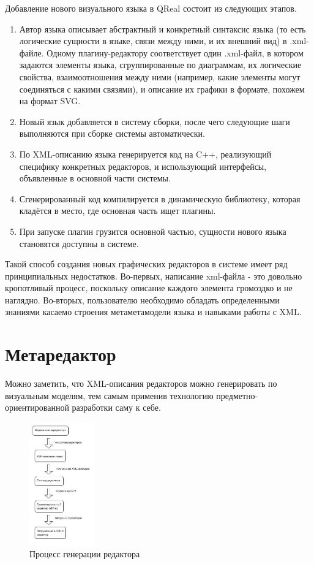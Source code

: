 \documentclass[a4paper]{article}
\begin{document}
Добавление нового визуального языка в QReal состоит из следующих этапов.
\begin{enumerate}
  \item Автор языка описывает абстрактный и конкретный синтаксис языка (то есть логические сущности в языке, связи между ними, и их внешний вид) в .xml-файле. Одному плагину-редактору соответствует один .xml-файл, в котором задаются элементы языка, сгруппированные по диаграммам, их логические свойства, взаимоотношения между ними (например, какие элементы могут соединяться с какими связями), и описание их графики в формате, похожем на формат SVG. 
  \item Новый язык добавляется в систему сборки, после чего следующие шаги выполняются при сборке системы автоматически.
  \item По XML-описанию языка генерируется код на C++, реализующий специфику конкретных редакторов, и использующий интерфейсы, объявленные в основной части системы.
  \item Сгенерированный код компилируется в динамическую библиотеку, которая кладётся в место, где основная часть ищет плагины.
  \item При запуске плагин грузится основной частью, сущности нового языка становятся доступны в системе.
\end{enumerate}

Такой способ создания новых графических редакторов в системе имеет ряд принципиальных недостатков. Во-первых, написание xml-файла - это довольно кропотливый процесс, поскольку описание каждого элемента громоздко и не наглядно. Во-вторых, пользователю необходимо обладать определенными знаниями касаемо строения метаметамодели языка и навыками работы с XML.

\section{Метаредактор}
Можно заметить, что XML-описания редакторов можно генерировать по визуальным моделям, тем самым применив технологию предметно-ориентированной разработки саму к себе.

\begin{figure}
  \begin{center}
    \includegraphics[width=0.25\textwidth]{editorGeneration.jpg}
    \caption{Процесс генерации редактора}
    \label{editorGeneration}
  \end{center}
\end{figure}
\end{document}
